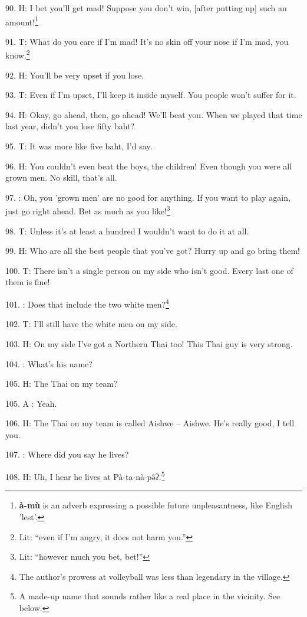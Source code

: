 90. H: I bet you'll get mad! Suppose you don't win, [after putting up] such an amount!\footnote{\textbf{à-mù} is an adverb expressing a possible future unpleasantness, like English 'lest'.}

91. T: What do you care if I'm mad! It's no skin off your nose if I'm mad, you know.\footnote{Lit: ``even if I'm angry, it does not harm you.''}

92. H: You'll be very upset if you lose.

93. T: Even if I'm upset, I'll keep it inside myself. You people won't suffer for
it.

94. H: Okay, go ahead, then, go ahead! We'll beat you. When we played that time
last year, didn't you lose fifty baht?

95. T: It was more like five baht, I'd say.

96. H: You couldn't even beat the boys, the children! Even though you were all grown
men. No skill, that's all.

97. : Oh, you 'grown men' are no good for anything. If you want to play again, just
go right ahead. Bet as much as you like!\footnote{Lit: ``however much you bet, bet!''}

98. T: Unless it's at least a hundred I wouldn't want to do it at all.

99. H: Who are all the best people that you've got? Hurry up and go bring them!

100. T: There isn't a single person on my side who isn't good. Every last one of
them is fine!

101. :  Does that include the two white men?\footnote{The author's prowess at volleyball was less than legendary in the village.}

102. T: I'll still have the white men on my side.

103. H: On my side I've got a Northern Thai too! This Thai guy is very strong.

104. : What's his name?

105. H: The Thai on my team?

105. A : Yeah.

106. H: The Thai on my team is called Aishwe -- Aishwe. He's really good, I tell
you.

107. : Where did you say he lives?

108. H: Uh, I hear he lives at Pà-ta-nà-pə̂ʔ.\footnote{A made-up name that sounds rather like a real place in the vicinity. See below.}


